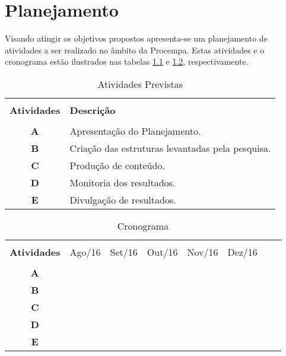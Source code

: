 \chapter{Planejamento}
Visando atingir os objetivos propostos apresenta-se um planejamento
de atividades a ser realizado no âmbito da Procempa. Estas atividades e o cronograma estão ilustrados nas tabelas \ref{tb:atividades} e
\ref{tb:cronograma}, respectivamente.


\begin{table}[!htb]
  \centering
  \caption{Atividades Previstas}\label{tb:atividades}
  \begin{tabular}{cp{12cm}}
    \hline \hline &\\[-0.4cm]
    \textbf{Atividades} & \textbf{Descrição} \\
    \hline
    &\\[-0.4cm]
    \textbf{A} & Apresentação do Planejamento. \\[0.2cm]
    \textbf{B} & Criação das estruturas levantadas pela pesquisa.\\[0.2cm]
    \textbf{C} & Produção de conteúdo.\\[0.2cm]
    \textbf{D} & Monitoria dos resultados. \\[0.2cm]
    \textbf{E} & Divulgação de resultados.\\[0.2cm]
    \hline \hline
  \end{tabular}
\end{table}


\begin{table}[!htb]
  \centering
  \caption{Cronograma}\label{tb:cronograma}
  \begin{tabular}{cp{1.3cm}p{1.3cm}p{1.3cm}p{1.3cm}p{1.3cm}p{1.3cm}p{1.3cm}}
    \hline \hline &\\[-0.4cm]
    \textbf{Atividades} & Ago/16 & Set/16 &  Out/16 & Nov/16 & Dez/16 \\
    \hline &\\[-0.4cm]
    \textbf{A} & \cellcolor{black!25} &   &   &   & \\[0.2cm]
    \textbf{B} & \cellcolor{black!25} & \cellcolor{black!25} &   &   & \\[0.2cm]
    \textbf{C} &   &  \cellcolor{black!25} & \cellcolor{black!25} & \cellcolor{black!25} & \cellcolor{black!25} \\[0.2cm]
    \textbf{D} &   &  & \cellcolor{black!25} & \cellcolor{black!25}  & \cellcolor{black!25} \\[0.2cm]
    \textbf{E} &   &    &   &  & \cellcolor{black!25}  \\[0.2cm]
    \hline \hline
  \end{tabular}
\end{table}
